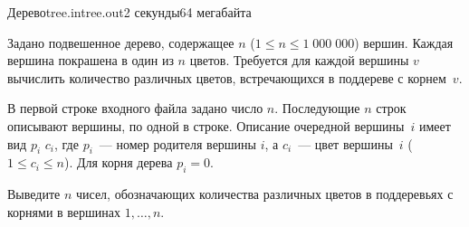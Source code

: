 \begin{problem}{Дерево}{tree.in}{tree.out}{2 секунды}{64 мегабайта}


Задано подвешенное дерево, содержащее $n$ ($1 \le n \le 1\;000\;000$)
вершин. Каждая вершина покрашена в один из $n$ цветов. Требуется для
каждой вершины $v$ вычислить количество различных цветов, встречающихся
в поддереве с корнем~$v$.

\InputFile

В первой строке входного файла задано число $n$. Последующие $n$ строк
описывают вершины, по одной в строке. Описание очередной вершины~$i$ имеет
вид $p_i$ $c_i$, где $p_i$~--- номер родителя вершины $i$, а $c_i$~--- цвет
вершины~$i$ ($1 \le c_i \le n$). Для корня дерева $p_i = 0$.

\OutputFile

Выведите $n$ чисел, обозначающих количества различных цветов в поддеревьях
с корнями в вершинах $1, \ldots, n$.

\Example

\begin{example}
%
\end{example}

\end{problem}
   